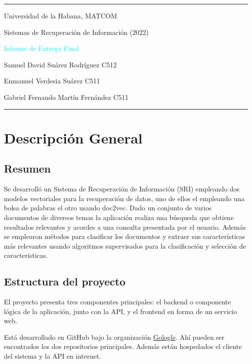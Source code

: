 \documentclass[12pt]{llncs}
\begin{document}
\begin{center}
\large{
\rule{\textwidth}{0.5pt}
\par Universidad de la Habana, MATCOM
\par Sistemas de Recuperación de Información (2022)
\vspace{0.4cm}
\par \textcolor{cyan}{Informe de Entrega Final}
\par Samuel David Suárez Rodríguez C512
\par Enmanuel Verdesia Suárez C511
\par Gabriel Fernando Martín Fernández C511
\rule{\textwidth}{1.5pt}
}

\end{center}

\section{Descripción General}
\vspace{0.5cm}
\subsection{Resumen}
\par Se desarrolló un Sistema de Recuperación de Información (SRI) empleando dos modelos vectoriales para la recuperación de datos, uno de ellos el empleando una bolsa de palabras el otro usando doc2vec. Dado un conjunto de varios documentos de diversos temas la aplicación realiza una búsqueda que obtiene resultados relevantes y acordes a una consulta presentada por el usuario. Además se emplearon métodos para clasificar los documentos y extraer sus características más relevantes usando algoritmos supervisados para la clasificación y selección de características.

\subsection{Estructura del proyecto}
\par El proyecto presenta tres componentes principales: el backend o componente lógica de la aplicación, junto con la API, y el frontend en forma de un servicio web.

Está desarrollado en GitHub bajo la organización \href{https://github.com/Gologle}{\color{blue}Gologle}. Ahí pueden ser encontrados los dos repositorios principales. Además están hospedados el cliente del sistema y la API en internet.
\end{document}
